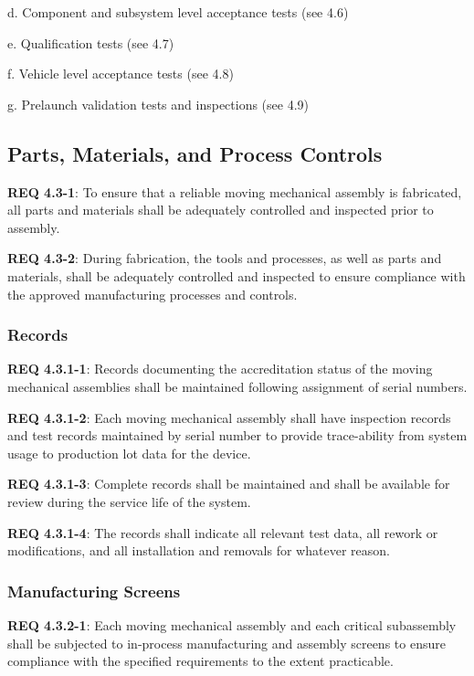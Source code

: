 \documentclass[12pt]{article}
\begin{document}
d. Component and subsystem level acceptance tests (see 4.6)

e. Qualification tests (see 4.7)

f. Vehicle level acceptance tests (see 4.8)

g. Prelaunch validation tests and inspections (see 4.9)


\subsection{Parts, Materials, and Process Controls} %
\noindent \textbf{REQ 4.3-1}: To ensure that a reliable moving mechanical assembly is fabricated, all parts and materials shall be adequately controlled and inspected prior to assembly. 

\noindent \textbf{REQ 4.3-2}: During fabrication, the tools and processes, as well as parts and materials, shall be adequately controlled and inspected to ensure compliance with the approved manufacturing processes and controls.


\subsubsection{Records} %
\noindent \textbf{REQ 4.3.1-1}: Records documenting the accreditation status of the moving mechanical assemblies shall be maintained following assignment of serial numbers. 

\noindent \textbf{REQ 4.3.1-2}: Each moving mechanical assembly shall have inspection records and test records maintained by serial number to provide trace-ability from system usage to production lot data for the device. 

\noindent \textbf{REQ 4.3.1-3}: Complete records shall be maintained and shall be available for review during the service life of the system. 

\noindent \textbf{REQ 4.3.1-4}: The records shall indicate all relevant test data, all rework or modifications, and all installation and removals for whatever reason.


\subsubsection{Manufacturing Screens} %
\noindent \textbf{REQ 4.3.2-1}: Each moving mechanical assembly and each critical subassembly shall be subjected to in-process manufacturing and assembly screens to ensure compliance with the specified requirements to the extent practicable. 
\end{document}
